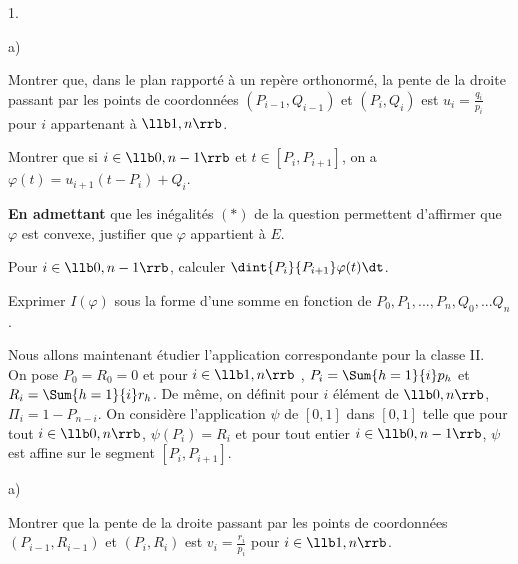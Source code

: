 \begin{noliste}{1.}
\begin{noliste}{a)}
  

  
  \item Montrer que, dans le plan rapporté à un repère orthonormé, la 
  pente de la droite passant par les points de coordonnées $(P_{i-1}, 
  Q_{i-1})$ et $(P_i, Q_i)$ est $u_i=\frac{q_i}{p_i}$ pour $i$ 
  appartenant à $\llb 1,n \rrb$. 
  
  
  
  
  
  

  
  \item Montrer que si $i \in \llb 0,n-1 \rrb$ et $t \in [P_i, 
  P_{i+1}]$, on a $\varphi(t) =u_{i+1} (t-P_i)+Q_i$. 
  
  
  
  \item \textbf{En admettant} que les inégalités $(\ast)$ de la 
  question  permettent d'affirmer que $\varphi$ est 
  convexe, justifier que $\varphi$ appartient à $E$. 
  
  

  
  \item Pour $i \in \llb 0,n-1 \rrb$, calculer $\dint{P_i}{P_{i+1}} 
  \varphi(t) \dt$. 
  
  
  
  \item Exprimer $I(\varphi)$ sous la forme d'une somme en fonction de 
  $P_0, P_1,...,P_n, Q_0,...Q_n$. 
  
  
 \end{noliste}
 
 \item Nous allons maintenant étudier l'application correspondante pour 
 la classe II.\\
 On pose $P_0=R_0=0$ et pour $i \in \llb 1,n \rrb$ , $P_i = 
 \Sum{h=1}{i} p_h$ et $R_i=\Sum{h=1}{i} r_h$. De même, on définit pour 
 $i$ élément de $\llb 0,n \rrb$, $\Pi_i=1-P_{n-i}$. On considère 
 l'application $\psi$ de $[0,1]$ dans $[0,1]$ telle que pour tout $i 
 \in \llb 0,n \rrb$, $\psi(P_i)=R_i$ et pour tout entier $i \in \llb 0, 
 n-1 \rrb$, $\psi$ est affine sur le segment $[P_i, P_{i+1}]$. 
 \begin{noliste}{a)}
  \setlength{\itemsep}{2mm}
  \item Montrer que la pente de la droite passant par les points de 
  coordonnées $(P_{i-1}, R_{i-1})$ et $(P_i, R_i)$ est $v_i 
  = \frac{r_i}{p_i}$ pour $i \in \llb 1,n \rrb$. 
  
  
  

\end{noliste}
\end{noliste}
